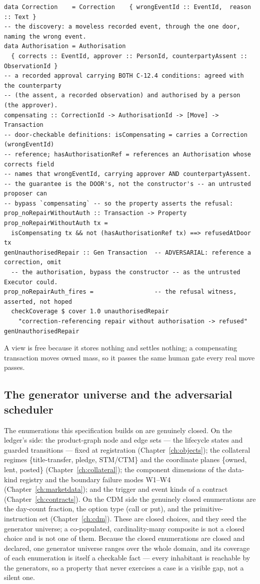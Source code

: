 \documentclass[11pt,a4paper]{article}
\begin{document}
\begin{lstlisting}
data Correction    = Correction    { wrongEventId :: EventId,  reason   :: Text }
-- the discovery: a moveless recorded event, through the one door, naming the wrong event.
data Authorisation = Authorisation
  { corrects :: EventId, approver :: PersonId, counterpartyAssent :: ObservationId }
-- a recorded approval carrying BOTH C-12.4 conditions: agreed with the counterparty
-- (the assent, a recorded observation) and authorised by a person (the approver).
compensating :: CorrectionId -> AuthorisationId -> [Move] -> Transaction
-- door-checkable definitions: isCompensating = carries a Correction (wrongEventId)
-- reference; hasAuthorisationRef = references an Authorisation whose corrects field
-- names that wrongEventId, carrying approver AND counterpartyAssent.
-- the guarantee is the DOOR's, not the constructor's -- an untrusted proposer can
-- bypass `compensating` -- so the property asserts the refusal:
prop_noRepairWithoutAuth :: Transaction -> Property
prop_noRepairWithoutAuth tx =
  isCompensating tx && not (hasAuthorisationRef tx) ==> refusedAtDoor tx
genUnauthorisedRepair :: Gen Transaction  -- ADVERSARIAL: reference a correction, omit
  -- the authorisation, bypass the constructor -- as the untrusted Executor could.
prop_noRepairAuth_fires =                 -- the refusal witness, asserted, not hoped
  checkCoverage $ cover 1.0 unauthorisedRepair
    "correction-referencing repair without authorisation -> refused" genUnauthorisedRepair
\end{lstlisting}

A view is free because it stores nothing and settles nothing; a compensating transaction
moves owned mass, so it passes the same human gate every real move passes.

\subsection{The generator universe and the adversarial scheduler}

The enumerations this specification builds on are genuinely closed. On the ledger's side:
the product-graph node and edge sets --- the lifecycle states and guarded transitions ---
fixed at registration (Chapter~\ref{ch:objects}); the collateral regimes
\{title-transfer, pledge, STM/CTM\} and the coordinate planes \{owned, lent, posted\}
(Chapter~\ref{ch:collateral}); the component dimensions of the data-kind registry and the
boundary failure modes W1--W4 (Chapter~\ref{ch:marketdata}); and the trigger and event
kinds of a contract (Chapter~\ref{ch:contracts}). On the CDM side the genuinely closed
enumerations are the day-count fraction, the option type (call or put), and the
primitive-instruction set (Chapter~\ref{ch:cdm}). These are closed choices, and they seed
the generator universe; a co-populated, cardinality-many composite is not a closed choice
and is not one of them. Because the closed enumerations are closed and declared, one
generator universe ranges over the whole domain, and its coverage of each enumeration is
itself a checkable fact --- every inhabitant is reachable by the generators, so a property
that never exercises a case is a visible gap, not a silent one.
\end{document}
